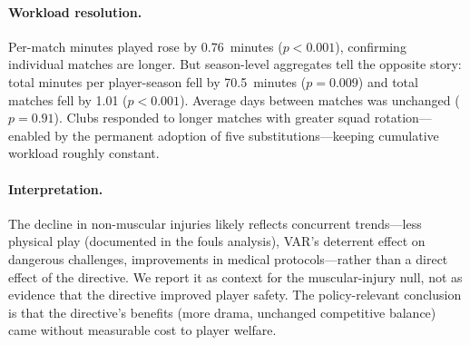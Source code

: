 \paragraph{Workload resolution.}
Per-match minutes played rose by $0.76$~minutes ($p < 0.001$),
confirming individual matches are longer. But season-level aggregates
tell the opposite story: total minutes per player-season fell by
70.5~minutes ($p = 0.009$) and total matches fell by 1.01
($p < 0.001$). Average days between matches was unchanged
($p = 0.91$). Clubs responded to longer matches with greater
squad rotation---enabled by the permanent adoption of five
substitutions---keeping cumulative workload roughly constant.

\paragraph{Interpretation.}
The decline in non-muscular injuries likely reflects concurrent
trends---less physical play (documented in the fouls analysis), VAR's
deterrent effect on dangerous challenges, improvements in medical
protocols---rather than a direct effect of the directive. We report it
as context for the muscular-injury null, not as evidence that the
directive improved player safety. The policy-relevant conclusion is
that the directive's benefits (more drama, unchanged competitive
balance) came without measurable cost to player welfare.



